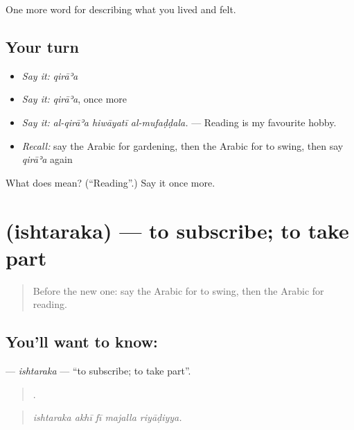 \begin{grammarlens}[title={What you've built}]
One more word for describing what you lived and felt.
\end{grammarlens}

\subsection*{Your turn}
\begin{itemize}
\raggedright
  \item \emph{Say it:} \emph{qirāʾa}
  \item \emph{Say it:} \emph{qirāʾa}, once more
  \item \emph{Say it:} \emph{al-qirāʾa hiwāyatī al-mufaḍḍala.} — Reading is my favourite hobby.
  \item \emph{Recall:} say the Arabic for gardening, then the Arabic for to swing, then say \emph{qirāʾa} again
\end{itemize}

\begin{tcolorbox}[breakable,colback=teal!4,colframe=teal!35!black,title={Before you move on}]
What does  mean? (\textquotedblleft{}Reading\textquotedblright{}.) Say it once more.
\end{tcolorbox}
\section[\texorpdfstring{\ar{اشترك} (ishtaraka)}{اشترك (ishtaraka)}]{ (ishtaraka) — to subscribe; to take part}

\label{lesson:AR-C540-ishtaraka}



\begin{quote}
Before the new one: say the Arabic for to swing, then the Arabic for reading.
\end{quote}

\subsection*{You'll want to know: }
\textbf{} — \emph{ishtaraka} — \textquotedblleft{}to subscribe; to take part\textquotedblright{}.

\begin{quote}
    .
\end{quote}

\begin{quote}
\emph{ishtaraka akhī fī majalla riyāḍiyya.}
\end{quote}

